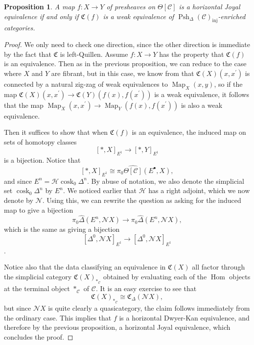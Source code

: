 \documentclass[a4paper]{article}
\numberwithin{equation}{subsection}
\theoremstyle{plain}   %
\newtheorem{prop}[equation]{Proposition}
\theoremstyle{definition}
\theoremstyle{remark}
\theoremstyle{plain}
\DeclareMathOperator{\Psh}{Psh}
\DeclareMathOperator{\Map}{Map}
\DeclareMathOperator{\Hom}{Hom}
\newcommand{\psh}[1]{\ensuremath{\widehat{#1}}}
\providecommand{\C}{}
\renewcommand{\C}{\ensuremath{\mathcal{C}}}
\newcommand{\cellset}{\ensuremath{\widehat{\Theta[\mathcal{C}]}}}
\begin{document}
\begin{prop}\label{conservativity}
	A map \(f:X\to Y\) of presheaves on \(\Theta[\C]\) is a horizontal Joyal equivalence if and only if \(\mathfrak{C}(f)\) is a weak equivalence of \(\Psh_\Delta (\C)_{\mathrm{inj}}\)-enriched categories.
\end{prop}
\begin{proof}
	We only need to check one direction, since the other direction is immediate by the fact that \(\mathfrak{C}\) is left-Quillen.  Assume \(f:X\to Y\) has the property that \(\mathfrak{C}(f)\) is an equivalence. Then as in the previous proposition, we can reduce to the case where \(X\) and \(Y\) are fibrant, but in this case, we know from  that \(\mathfrak{C}(X)(x,x^\prime)\) is connected by a natural zig-zag of weak equivalences to \(\Map_X(x,y)\), so if the map  \(\mathfrak{C}(X)(x,x^\prime)\to \mathfrak{C}(Y)(f(x),f(x^\prime))\) is a weak equivalence, it follows that the map \(\Map_X(x,x^\prime)\to \Map_Y(f(x),f(x^\prime))\) is also a weak equivalence.

	Then it suffices to show that when \(\mathfrak{C}(f)\) is an equivalence, the induced map on sets of homotopy classes
	\[[\ast,X]_{E^1} \to [\ast,Y]_{E^1}\]
	is a bijection.  Notice that
	\[[\ast,X]_{E^1} \cong \pi_0 \cellset(E^\bullet,X),\]
	and since \(E^n=\mathscr{H}\operatorname{cosk}_0 \Delta^n\). By abuse of notation, we also denote the simplicial set \(\operatorname{cosk}_0 \Delta^n\) by \(E^n\).  We noticed earlier that \(\mathscr{H}\) has a right adjoint, which we now denote by \(\mathscr{N}\). Using this, we can rewrite the question as asking for the induced map to give a bijection
	\[\pi_0 \psh{\Delta}(E^n,\mathscr{N}X) \to \pi_0 \psh{\Delta}(E^n,\mathscr{N}X),\]
	which is the same as giving a bijection
	\[[\Delta^0,\mathscr{N}X]_{E^1}\to [\Delta^0,\mathscr{N}X]_{E^1}\].

	Notice also that the data classifying an equivalence in \(\mathfrak{C}(X)\) all factor through the simplicial category \(\mathfrak{C}(X)_{\ast_\C}\) obtained by evaluating each of the \(\Hom\) objects at the terminal object \(\ast_{\C}\) of \(\C\).  It is an easy exercise to see that
	\[\mathfrak{C}(X)_{\ast_\C} \cong \mathfrak{C}_\Delta (\mathscr{N}X),\]
	but since \(\mathscr{N}X\) is quite clearly a quasicategory, the claim follows immediately from the ordinary case.  This implies that \(f\) is a horizontal Dwyer-Kan equivalence, and therefore by the previous proposition, a horizontal Joyal equivalence, which concludes the proof.
\end{proof}
\end{document}
